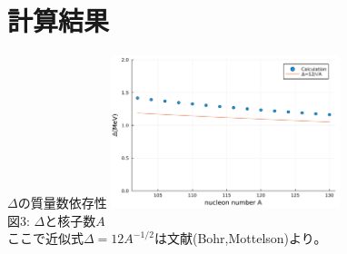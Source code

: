 \documentclass[aspectratio=169, 12pt, dvipdfmx]{beamer}
\begin{document}
\section{計算結果}

\begin{frame}{$\Delta$の質量数依存性}
  \centering
  \includegraphics[width=0.5\textwidth]{Delta_vs_A.pdf}
  \vspace{5pt} %
  \\
  \scriptsize 図3: $\Delta$と核子数$A$\\
  ここで近似式$\Delta=12A^{-1/2}$は文献\cite{nucleus_structure}(Bohr,Mottelson)より。
\end{frame}
\end{document}
